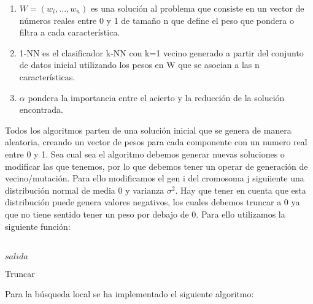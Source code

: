 \documentclass[14pt]{article}
\begin{document}
\begin{enumerate}
\item $W = (w_i,..., w_n)$ es una solución al problema que consiste en un vector de números reales entre 0 y 1 de tamaño n que define el peso que pondera o filtra a cada característica.
\item 1-NN es el clasificador k-NN con k=1 vecino generado a partir del conjunto de datos inicial utilizando los pesos en W que se asocian a las n características.
\item $\alpha$ pondera la importancia entre el acierto y la reducción de la solución encontrada.
\end{enumerate}

Todos los algoritmos parten de una solución inicial que se genera de manera aleatoria, creando un vector de pesos para cada componente con un numero real entre 0 y 1. Sea cual sea el algoritmo debemos generar nuevas soluciones o modificar las que tenemos, por lo que debemos tener un operar de generación de vecino/mutación. Para ello modificamos el gen i del cromosoma j siguiiente una distribución normal de media 0 y varianza $\sigma^2$. Hay que tener en cuenta que esta distribución puede genera valores negativos, los cuales debemos truncar a 0 ya que no tiene sentido tener un peso por debajo de 0. Para ello utilizamos la siguiente función:

\begin{algorithm}[H]
	\begin{algorithmic}[1]
	\label{lin:lineaRara}
	\EndIf \\
	\Return $salida$
	\end{algorithmic}
	\caption{Truncar}
\end{algorithm}

	Para la búsqueda local se ha implementado el siguiente algoritmo:
\end{document}
